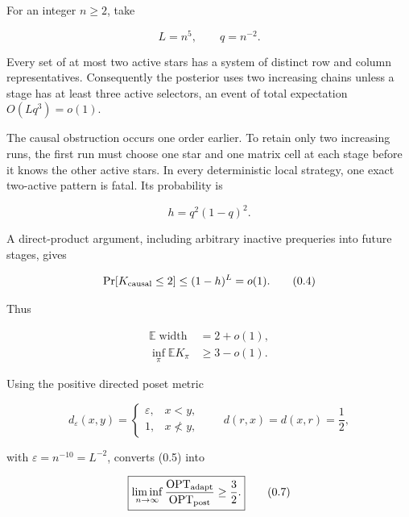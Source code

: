 \documentclass[11pt,a4paper]{article}
\begin{document}
For an integer \(n\ge2\), take


\begin{equation}
                         L=n^5,\qquad q=n^{-2}.
\tag{0.2}
\end{equation}

Every set of at most two active stars has a system of distinct row and column representatives.  Consequently the posterior uses two increasing chains unless a stage has at least three active selectors, an event of total expectation \(O(Lq^3)=o(1)\).


The causal obstruction occurs one order earlier.  To retain only two increasing runs, the first run must choose one star and one matrix cell at each stage before it knows the other active stars.  In every deterministic local strategy, one exact two-active pattern is fatal.  Its probability is


\begin{equation}
                         h=q^2(1-q)^2.
\tag{0.3}
\end{equation}

A direct-product argument, including arbitrary inactive prequeries into future stages, gives


\begin{equation}
 \Pr[K_{\rm causal}\le2]\le(1-h)^L=o(1).
\tag{0.4}
\end{equation}

Thus


\begin{equation}
\begin{aligned}
 \mathbb E\operatorname{width}&=2+o(1),\\
 \inf_\pi\mathbb E K_\pi&\ge3-o(1).
\end{aligned}
\tag{0.5}
\end{equation}

Using the positive directed poset metric


\begin{equation}
 d_\varepsilon(x,y)=
 \begin{cases}
  \varepsilon,&x<y,\\
  1,&x\not<y,
 \end{cases}
 \qquad
 d(r,x)=d(x,r)=\frac12,
\tag{0.6}
\end{equation}

with \(\varepsilon=n^{-10}=L^{-2}\), converts (0.5) into


\begin{equation}
 \boxed{\displaystyle
 \liminf_{n\to\infty}
 \frac{\operatorname{OPT}_{\rm adapt}}
      {\operatorname{OPT}_{\rm post}}
             \ge\frac32.}
\tag{0.7}
\end{equation}
\end{document}
